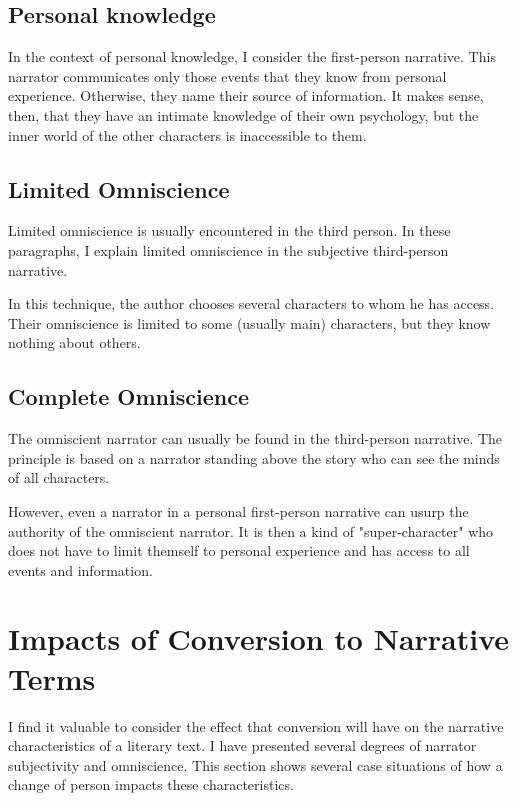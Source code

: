 \subsection{Personal knowledge}

In the context of personal knowledge, I consider the first-person narrative. This narrator communicates only those events that they know from personal experience. Otherwise, they name their source of information. It makes sense, then, that they have an intimate knowledge of their own psychology, but the inner world of the other characters is inaccessible to them. \cite{dolezel-narativni-zpusoby}

\subsection{Limited Omniscience}

Limited omniscience is usually encountered in the third person. In these paragraphs, I explain limited omniscience in the subjective third-person narrative.

In this technique, the author chooses several characters to whom he has access. Their omniscience is limited to some (usually main) characters, but they know nothing about others. \cite{docekalova}

\subsection{Complete Omniscience}

The omniscient narrator can usually be found in the third-person narrative. The principle is based on a narrator standing above the story who can see the minds of all characters. \cite{docekalova}

However, even a narrator in a personal first-person narrative can usurp the authority of the omniscient narrator. It is then a kind of "super-character" who does not have to limit themself to personal experience and has access to all events and information. \cite{dolezel-narativni-zpusoby}


\section{Impacts of Conversion to Narrative Terms}

I find it valuable to consider the effect that conversion will have on the narrative characteristics of a literary text. I have presented several degrees of narrator subjectivity and omniscience. This section shows several case situations of how a change of person impacts these characteristics.

